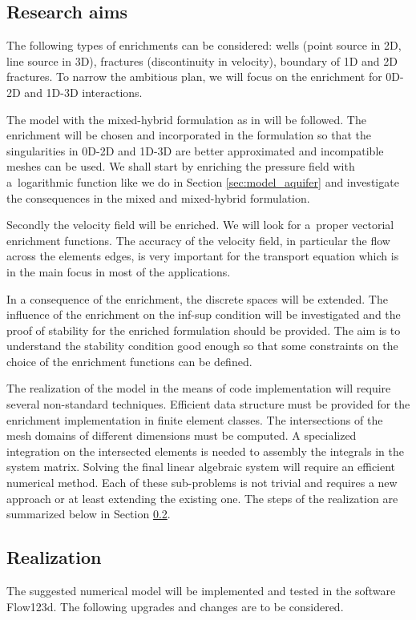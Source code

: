 \subsection{Research aims}

The following types of enrichments can be considered: wells (point source in 2D, line source in 3D), 
fractures (discontinuity in velocity), boundary of 1D and 2D fractures. 
To narrow the ambitious plan, we will focus on the enrichment for 0D-2D and 1D-3D interactions.

The model with the mixed-hybrid formulation as in \cite{brezina_mixed-hybrid_2010, sistek_bddc_2015} will be followed.
The enrichment will be chosen and incorporated in the formulation so that the singularities in 0D-2D and
1D-3D are better approximated and incompatible meshes can be used. 
We shall start by enriching the pressure field with a~logarithmic function like we
do in Section \ref{sec:model_aquifer} and investigate the consequences in the mixed and mixed-hybrid formulation.

Secondly the velocity field will be enriched. We will look for a~proper vectorial enrichment functions.
The accuracy of the velocity field, in particular the flow across the elements edges, is very important for
the transport equation which is in the main focus in most of the applications.

In a consequence of the enrichment, the discrete spaces will be extended. The influence of the enrichment on the inf-sup 
condition will be investigated and the proof of stability for the enriched formulation should be provided.
The aim is to understand the stability condition good enough so that some constraints on the choice of the enrichment 
functions can be defined. 

The realization of the model in the means of code implementation will require several non-standard techniques.
Efficient data structure must be provided for the enrichment implementation in finite element classes.
The intersections of the mesh domains of different dimensions must be computed. A specialized integration
on the intersected elements is needed to assembly the integrals in the system matrix. 
Solving the final linear algebraic system will require an efficient numerical method.
Each of these sub-problems is not trivial and requires a new approach or at least extending the existing one.
The steps of the realization are summarized below in Section \ref{sec:realization}.

\subsection{Realization} \label{sec:realization}
The suggested numerical model will be implemented and tested in the software Flow123d.
The following upgrades and changes are to be considered.

